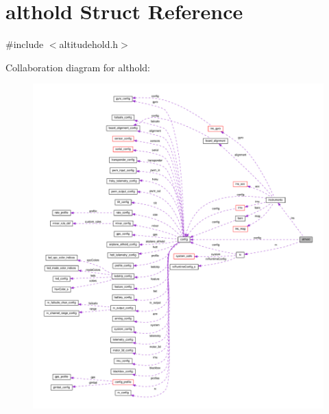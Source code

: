 \hypertarget{structalthold}{\section{althold Struct Reference}
\label{structalthold}
}


{\ttfamily \#include $<$altitudehold.\+h$>$}



Collaboration diagram for althold\+:\nopagebreak
\begin{figure}[H]
\begin{center}
\leavevmode
\includegraphics[width=350pt]{structalthold__coll__graph}
\end{center}
\end{figure}
